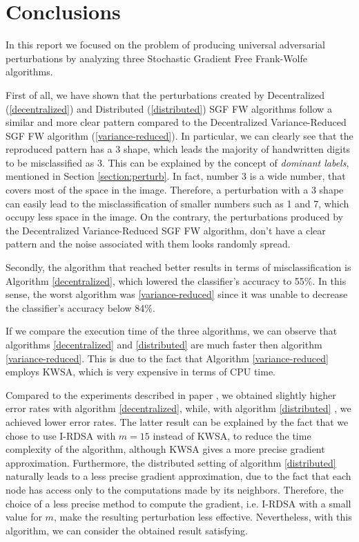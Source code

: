\section{Conclusions}
In this report we focused on the problem of producing universal adversarial perturbations by analyzing three
Stochastic Gradient Free Frank-Wolfe algorithms.

First of all, we have shown that the perturbations created by Decentralized (\ref{decentralized}) and Distributed (\ref{distributed})
SGF FW algorithms follow a similar and more clear pattern compared to the Decentralized Variance-Reduced SGF FW
algorithm (\ref{variance-reduced}). In particular, we can clearly see that the reproduced pattern has a 3 shape, which
leads the majority of handwritten digits to be misclassified as 3. This can be explained by the concept of \textit{dominant labels},
mentioned in Section \ref{section:perturb}. In fact, number 3 is a wide number, that covers most of the space in the image. Therefore, a
perturbation with a 3 shape can easily lead to the misclassification of smaller numbers such as 1 and 7, which occupy
less space in the image. On the contrary, the perturbations produced by the Decentralized Variance-Reduced SGF FW algorithm,
don't have a clear pattern and the noise associated with them looks randomly spread.

Secondly, the algorithm that reached better results in terms of misclassification is Algorithm \ref{decentralized},
which lowered the classifier's accuracy to 55\%. In this sense, the worst algorithm was \ref{variance-reduced} since
it was unable to decrease the classifier's accuracy below 84\%.

If we compare the execution time of the three algorithms, we can observe that algorithms \ref{decentralized} and \ref{distributed}
are much faster then algorithm \ref{variance-reduced}. This is due to the fact that Algorithm \ref{variance-reduced}
employs KWSA, which is very expensive in terms of CPU time.

Compared to the experiments described in paper \cite{A3}, we obtained slightly higher error rates with algorithm
\ref{decentralized}, while, with algorithm \ref{distributed} , we achieved lower error rates. The latter result can be
explained by the fact that we chose to use I-RDSA with $m=15$ instead of KWSA, to reduce the time complexity of the algorithm,
although KWSA gives a more precise gradient approximation. Furthermore, the distributed setting of algorithm \ref{distributed}
naturally leads to a less precise gradient approximation, due to the fact that each node has access only to the
computations made by its neighbors. Therefore, the choice of a less precise method to compute the gradient, i.e. I-RDSA with a
small value for $m$, make the resulting perturbation less effective. Nevertheless, with this algorithm, we can consider the obtained result satisfying.

